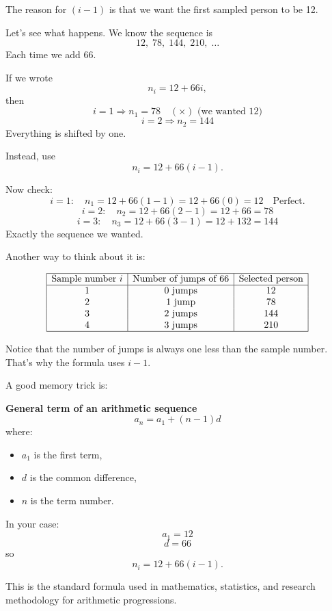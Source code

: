 \documentclass{article}
\begin{document}
	The reason for \((i-1)\) is that we want the first sampled person to be 12.
	
	Let's see what happens. We know the sequence is
	\[
	12,\;78,\;144,\;210,\;\ldots
	\]
	Each time we add 66.
	
	If we wrote
	\[
	n_i = 12 + 66i,
	\]
	then
	\[	i=1 \Rightarrow n_1 = 78 \quad (\times) \text{ (we wanted 12)}\]
	\[
	i=2 \Rightarrow n_2 = 144
	\]
	Everything is shifted by one.
	
	Instead, use
	\[
	n_i = 12 + 66(i-1).
	\]
	
	Now check:
	\[
	i=1:\quad n_1 = 12 + 66(1-1) = 12 + 66(0) = 12 \quad \text{Perfect.}
	\]
	\[
	i=2:\quad n_2 = 12 + 66(2-1) = 12 + 66 = 78
	\]
	\[
	i=3:\quad n_3 = 12 + 66(3-1) = 12 + 132 = 144
	\]
	Exactly the sequence we wanted.
	
	Another way to think about it is:
	
	\[
	\begin{array}{|c|c|c|}
		\hline
		\text{Sample number } i & \text{Number of jumps of 66} & \text{Selected person} \\
		\hline
		1 & 0 \text{ jumps} & 12 \\
		2 & 1 \text{ jump} & 78 \\
		3 & 2 \text{ jumps} & 144 \\
		4 & 3 \text{ jumps} & 210 \\
		\hline
	\end{array}
	\]
	
	Notice that the number of jumps is always one less than the sample number. That's why the formula uses \(i-1\).
	
	A good memory trick is:
	
	\textbf{General term of an arithmetic sequence}
	\[	a_n = a_1 + (n-1)d	\]
	where:
	\begin{itemize}
		\item \(a_1\) is the first term,
		\item \(d\) is the common difference,
		\item \(n\) is the term number.
	\end{itemize}
	
	In your case:
	\[a_1 = 12\]
	\[
	d = 66
	\]
	so
	\[
	n_i = 12 + 66(i-1).
	\]
	
	This is the standard formula used in mathematics, statistics, and research methodology for arithmetic progressions.
	
\end{document}
